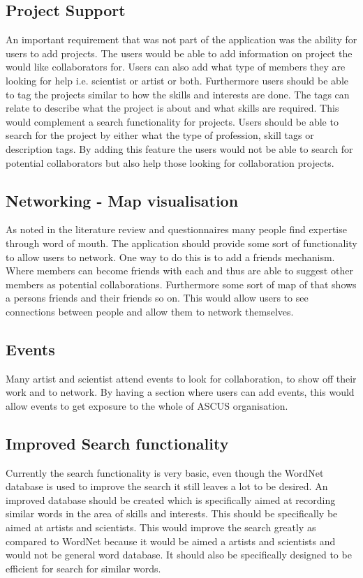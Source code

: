 \documentclass[a4paper,oneside,11pt]{report}
\begin{document}
\subsection{Project Support}
An important requirement that was not part of the application was the ability for users to add projects. The users would be able to add information on project the would like collaborators for. Users can also add what type of members they are looking for help i.e. scientist or artist or both. Furthermore users should be able to tag the projects similar to how the skills and interests are done. The tags can relate to describe what the project is about and what skills are required. This would complement a search functionality for projects. Users should be able to search for the project by either what the type of profession, skill tags or description tags. By adding this feature the users would not be able to search for potential collaborators but also help those looking for collaboration projects.

\subsection{Networking - Map visualisation}
As noted in the literature review and questionnaires many people find expertise through word of mouth. The application should provide some sort of functionality to allow users to network. One way to do this is to add a friends mechanism. Where members can become friends with each and thus are able to suggest other members as potential collaborations. Furthermore some sort of map of that shows a persons friends and their friends so on. This would allow users to see connections between people and allow them to network themselves.
\subsection{Events}
Many artist and scientist attend events to look for collaboration, to show off their work and to network. By having a section where users can add events, this would allow events to get exposure to the whole of ASCUS organisation.

\subsection{Improved Search functionality}
Currently the search functionality is very basic, even though the WordNet database is used to improve the search it still leaves a lot to be desired. An improved database should be created which is specifically aimed at recording similar words in the area of skills and interests. This should be specifically be aimed at artists and scientists. This would improve the search greatly as compared to WordNet because it would be aimed a artists and scientists and would not be general word database. It should also be specifically designed to be efficient for search for similar words.
\end{document}
